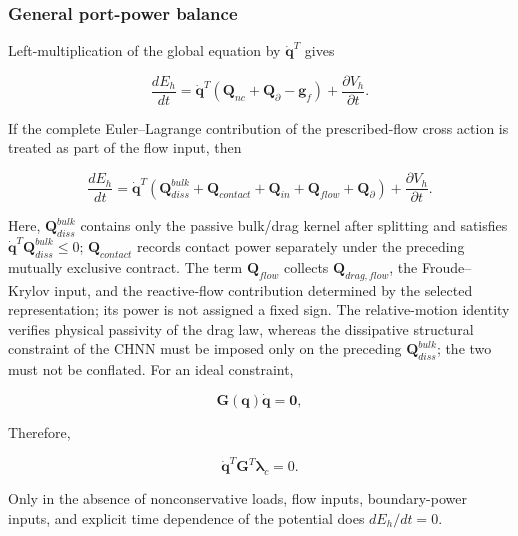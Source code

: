 \subsubsection{General port-power balance}\label{sec:galerkin-2-9-2}

Left-multiplication of the global equation by \({\dot{\mathbf{q}}}^{T}\) gives

\begin{equation}
\label{eq:galerkin-2-103}
\frac{dE_{h}}{dt} = {\dot{\mathbf{q}}}^{T}\left( \mathbf{Q}_{nc} + \mathbf{Q}_{\partial} - \mathbf{g}_{f} \right) + \frac{\partial V_{h}}{\partial t}.
\end{equation}

If the complete Euler--Lagrange contribution of the prescribed-flow cross action is treated as part of the flow input, then

\begin{equation}
\label{eq:galerkin-2-104}
\boxed{\frac{dE_{h}}{dt} = {\dot{\mathbf{q}}}^{T}\left( \mathbf{Q}_{diss}^{bulk} + \mathbf{Q}_{contact} + \mathbf{Q}_{in} + \mathbf{Q}_{flow} + \mathbf{Q}_{\partial} \right) + \frac{\partial V_{h}}{\partial t}.}
\end{equation}

Here, \(\mathbf{Q}_{diss}^{bulk}\) contains only the passive bulk/drag kernel after splitting and satisfies \({\dot{\mathbf{q}}}^{T}\mathbf{Q}_{diss}^{bulk} \leq 0\); \(\mathbf{Q}_{contact}\) records contact power separately under the preceding mutually exclusive contract. The term \(\mathbf{Q}_{flow}\) collects \(\mathbf{Q}_{drag,flow}\), the Froude--Krylov input, and the reactive-flow contribution determined by the selected representation; its power is not assigned a fixed sign. The relative-motion identity verifies physical passivity of the drag law, whereas the dissipative structural constraint of the CHNN must be imposed only on the preceding \(\mathbf{Q}_{diss}^{bulk}\); the two must not be conflated. For an ideal constraint,

\begin{equation}
\label{eq:galerkin-2-105}
\mathbf{G}\left( \mathbf{q} \right)\dot{\mathbf{q}} = \mathbf{0},
\end{equation}

Therefore,

\begin{equation}
\label{eq:galerkin-2-106}
{\dot{\mathbf{q}}}^{T}\mathbf{G}^{T}\bm{\lambda}_{c} = 0.
\end{equation}

Only in the absence of nonconservative loads, flow inputs, boundary-power inputs, and explicit time dependence of the potential does \(dE_{h}/dt = 0\).

